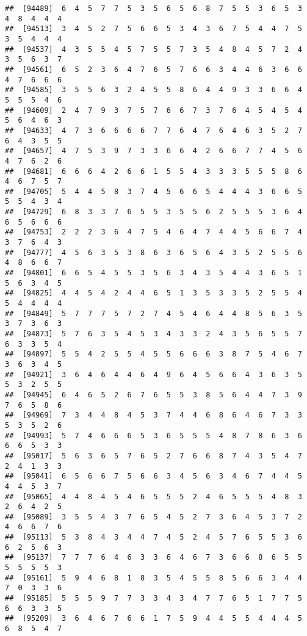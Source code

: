 \documentclass[
]{book}
\begin{document}
\begin{verbatim}
##  [94489]  6  4  5  7  7  5  3  5  6  5  6  8  7  5  5  3  6  5  3  4  8  4  4  4
##  [94513]  3  4  5  2  7  5  6  6  5  3  4  3  6  7  5  4  4  7  5  3  5  4  4  4
##  [94537]  4  3  5  5  4  5  7  5  5  7  3  5  4  8  4  5  7  2  4  3  5  6  3  7
##  [94561]  6  5  2  3  6  4  7  6  5  7  6  6  3  4  4  6  3  6  6  4  7  6  6  6
##  [94585]  3  5  5  6  3  2  4  5  5  8  6  4  4  9  3  3  6  6  4  5  5  5  4  6
##  [94609]  2  4  7  9  3  7  5  7  6  6  7  3  7  6  4  5  4  5  4  5  6  4  6  3
##  [94633]  4  7  3  6  6  6  6  7  7  6  4  7  6  4  6  3  5  2  7  6  4  3  5  5
##  [94657]  4  7  5  3  9  7  3  3  6  6  4  2  6  6  7  7  4  5  6  4  7  6  2  6
##  [94681]  6  6  6  4  2  6  6  1  5  5  4  3  3  3  5  5  5  8  6  4  6  7  5  7
##  [94705]  5  4  4  5  8  3  7  4  5  6  6  5  4  4  4  3  6  6  5  5  5  4  3  4
##  [94729]  6  8  3  3  7  6  5  5  3  5  5  6  2  5  5  5  3  6  4  6  5  6  6  6
##  [94753]  2  2  2  3  6  4  7  5  4  6  4  7  4  4  5  6  6  7  4  3  7  6  4  3
##  [94777]  4  5  6  3  5  3  8  6  3  6  5  6  4  3  5  2  5  5  6  4  8  6  6  7
##  [94801]  6  6  5  4  5  5  3  5  6  3  4  3  5  4  4  3  6  5  1  5  6  3  4  5
##  [94825]  4  4  5  4  2  4  4  6  5  1  3  5  3  3  5  2  5  5  4  5  4  4  4  4
##  [94849]  5  7  7  7  5  7  2  7  4  5  4  6  4  4  8  5  6  3  5  3  7  3  6  3
##  [94873]  5  7  6  3  5  4  5  3  4  3  3  2  4  3  5  6  5  5  7  6  3  3  5  4
##  [94897]  5  5  4  2  5  5  4  5  5  6  6  6  3  8  7  5  4  6  7  3  6  3  4  5
##  [94921]  3  6  4  6  4  4  6  4  9  6  4  5  6  6  4  3  6  3  5  5  3  2  5  5
##  [94945]  6  4  6  5  2  6  7  6  5  5  3  8  5  6  4  4  7  3  9  7  6  5  8  6
##  [94969]  7  3  4  4  8  4  5  3  7  4  4  6  8  6  4  6  7  3  3  5  3  5  2  6
##  [94993]  5  7  4  6  6  6  5  3  6  5  5  5  4  8  7  8  6  3  6  6  6  5  3  3
##  [95017]  5  6  3  6  5  7  6  5  2  7  6  6  8  7  4  3  5  4  7  2  4  1  3  3
##  [95041]  6  5  6  6  7  5  6  6  3  4  5  6  3  4  6  7  4  4  5  4  4  5  3  7
##  [95065]  4  4  8  4  5  4  6  5  5  5  2  4  6  5  5  5  4  8  3  2  6  4  2  5
##  [95089]  3  5  5  4  3  7  6  5  4  5  2  7  3  6  4  5  3  7  2  4  6  6  7  6
##  [95113]  5  3  8  4  3  4  4  7  4  5  2  4  5  7  6  5  5  3  6  6  2  5  6  3
##  [95137]  7  7  7  6  4  6  3  3  6  4  6  7  3  6  6  8  6  5  5  5  5  5  5  3
##  [95161]  5  9  4  6  8  1  8  3  5  4  5  5  8  5  6  6  3  4  4  7  0  3  3  6
##  [95185]  5  5  5  9  7  7  3  3  4  3  4  7  7  6  5  1  7  7  5  6  6  3  3  5
##  [95209]  3  6  4  6  7  6  6  1  7  5  9  4  4  5  5  4  4  4  5  6  8  5  4  7

\end{verbatim}
\end{document}
